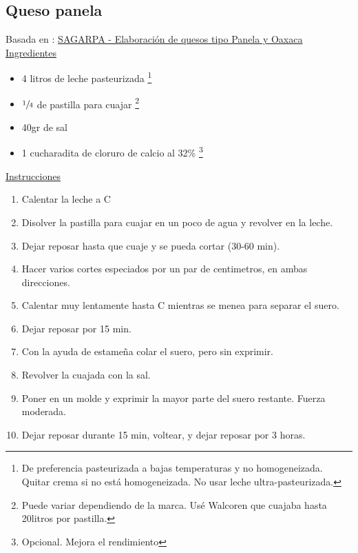 \subsection{Queso panela}

Basada en : \href{http://www.sagarpa.gob.mx/desarrolloRural/Documents/fichasaapt/Elaboraci%C3%B3n%20de%20quesos.pdf}{SAGARPA - Elaboración de quesos tipo Panela y Oaxaca} \\

\underline{Ingredientes}
\begin{itemize}
\item 4 litros de leche pasteurizada \footnote{De preferencia pasteurizada a bajas temperaturas y no homogeneizada. Quitar crema si no está homogeneizada. No usar leche ultra-pasteurizada.}
\item $\sfrac{1}{4}$ de pastilla para cuajar \footnote{Puede variar dependiendo de la marca. Usé Walcoren que cuajaba hasta 
\Sim 20litros por pastilla.}
\item 40gr de sal
\item 1 cucharadita de cloruro de calcio al 32\% \footnote{Opcional. Mejora el rendimiento}
\end{itemize}


\underline{Instrucciones}
\begin{enumerate}
\item Calentar la leche a  C
\item Disolver la pastilla para cuajar en un poco de agua y revolver en la leche.
\item Dejar reposar hasta que cuaje y se pueda cortar (30-60 min).
\item Hacer varios cortes especiados por un par de centimetros, en ambas direcciones.
\item Calentar muy lentamente hasta  C mientras se menea para separar el suero.
\item Dejar reposar por 15 min.
\item Con la ayuda de estameña colar el suero, pero sin exprimir.
\item Revolver la cuajada con la sal.
\item Poner en un molde y exprimir la mayor parte del suero restante. Fuerza moderada.
\item Dejar reposar durante 15 min, voltear, y dejar reposar por 3 horas.
\end{enumerate}
